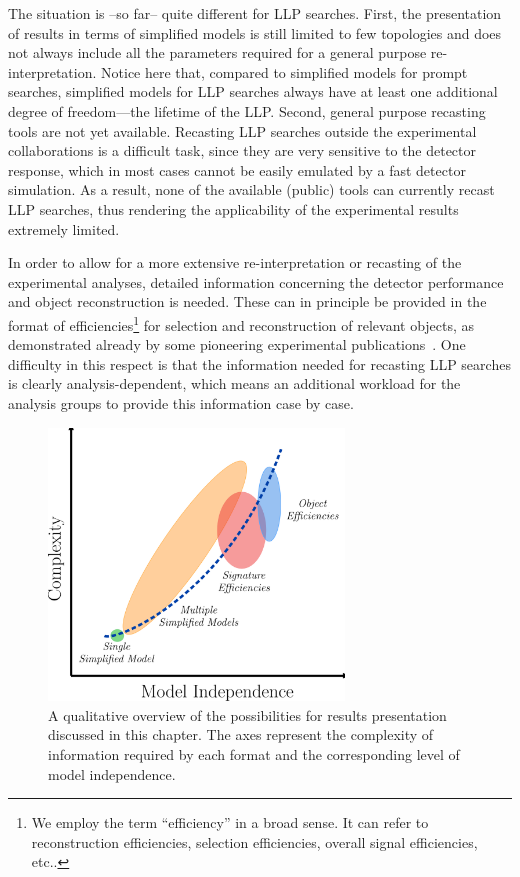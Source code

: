 The situation is --so far-- quite different for LLP searches. 
First, the presentation of results in terms of simplified models 
is still limited to few topologies and does not always include all the
parameters required for a general purpose re-interpretation. 
Notice here that, compared to simplified models for prompt searches, simplified models 
for LLP searches always have at least one additional degree of freedom---the lifetime of the LLP. 
Second, general purpose recasting tools are not yet available.
Recasting LLP searches outside the experimental collaborations is  a
difficult task, since they are very sensitive to the detector response, which in most cases 
cannot be easily emulated by a fast detector simulation.
As a result, none of the available (public) tools can currently recast
LLP searches, thus rendering the applicability of the experimental
results extremely limited. 

In order to allow for a more extensive re-interpretation or recasting of 
the experimental analyses, detailed information concerning the detector
performance and object reconstruction is needed.
These can in principle be provided in the format of efficiencies\footnote{We
employ the term ``efficiency'' in a broad sense. It can refer to reconstruction
efficiencies, selection efficiencies, overall signal efficiencies, etc..}
for selection and reconstruction of relevant objects, as demonstrated
already by some pioneering experimental publications~\cite{Khachatryan:2015lla,Aaboud:2017iio}.
One difficulty in this respect is that the information needed for recasting LLP searches is clearly
analysis-dependent, which means an additional workload for the analysis groups to provide this information 
case by case.  

\begin{figure}[t]
\begin{center}
\includegraphics[width=0.7\textwidth,angle=0]{ch5-figures/LLP_interpretationsB.png}
\end{center}
\caption{A qualitative overview of the possibilities
for results presentation discussed in this chapter.
The axes represent the complexity of information required by each
format and the corresponding level of model independence.}
\label{fig:ch5-complexity-vs-modelindependence}
\end{figure}

